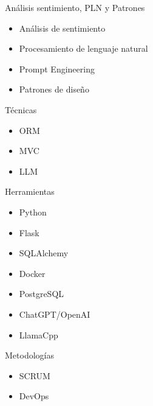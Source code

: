 \documentclass[aspectratio=169,xcolor=dvipsnames, t]{beamer}
\begin{document}

\begin{frame}{Análisis sentimiento, PLN y Patrones}
    \begin{itemize}
        \item Análisis de sentimiento
        \item Procesamiento de lenguaje natural
        \item Prompt Engineering
        \item Patrones de diseño
    \end{itemize}
\end{frame}


\begin{frame}{Técnicas}
    \begin{itemize}
        \item ORM
        \item MVC
        \item LLM
    \end{itemize}
\end{frame}

\begin{frame}{Herramientas}
    \begin{itemize}
        \item Python
        \item Flask
        \item SQLAlchemy
        \item Docker
        \item PostgreSQL
        \item ChatGPT/OpenAI
        \item LlamaCpp
    \end{itemize}
\end{frame}



\begin{frame}{Metodologías}
    \begin{itemize}
        \item SCRUM
        \item DevOps
    \end{itemize}
\end{frame}
\end{document}
